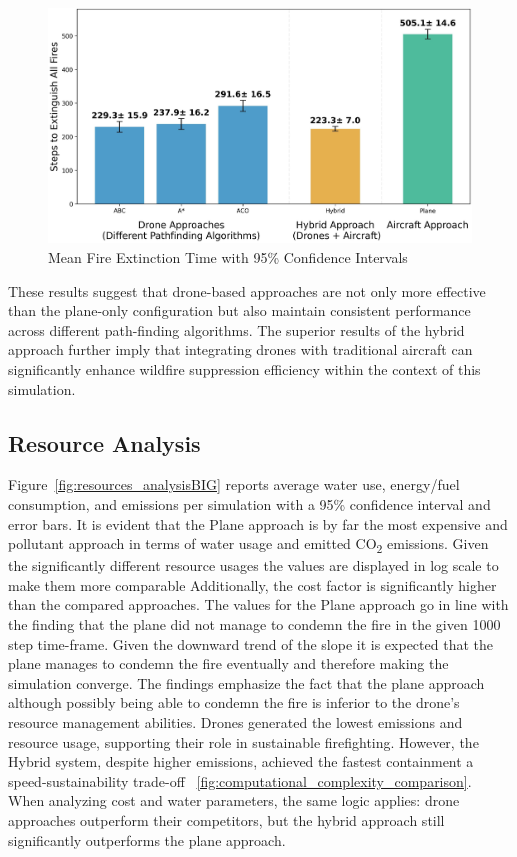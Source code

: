 \documentclass[11pt, a4paper]{article}
\begin{document}
\begin{figure}[htbp]
    \centering
    \includegraphics[width=1\linewidth]{figures/fire_extinction_comparison.jpeg}
    \caption{Mean Fire Extinction Time with 95\% Confidence Intervals}
    \label{fig:comparitive_analysis}
\end{figure}

These results suggest that drone-based approaches are not only more effective than the plane-only configuration but also maintain consistent performance across different path-finding algorithms. The superior results of the hybrid approach further imply that integrating drones with traditional aircraft can significantly enhance wildfire suppression efficiency within the context of this simulation.



\subsection{Resource Analysis}

Figure~\ref{fig:resources_analysisBIG} reports average water use, energy/fuel consumption, and emissions per simulation with a 95\% confidence interval and error bars. It is evident that the Plane approach is by far the most expensive and pollutant approach in terms of water usage and emitted CO\textsubscript{2} emissions. Given the significantly different resource usages the values are displayed in log scale to make them more comparable Additionally, the cost factor is significantly higher than the compared approaches. The values for the Plane approach go in line with the finding that the plane did not manage to condemn the fire in the given 1000 step time-frame. Given the downward trend of the slope it is expected that the plane manages to condemn the fire eventually and therefore making the simulation converge. The findings emphasize the fact that the plane approach although possibly being able to condemn the fire is inferior to the drone's resource management abilities. Drones generated the lowest emissions and resource usage, supporting their role in sustainable firefighting. However, the Hybrid system, despite higher emissions, achieved the fastest containment a speed-sustainability trade-off ~\ref{fig:computational_complexity_comparison}. When analyzing cost and water parameters, the same logic applies: drone approaches outperform their competitors, but the hybrid approach still significantly outperforms the plane approach.
\end{document}
